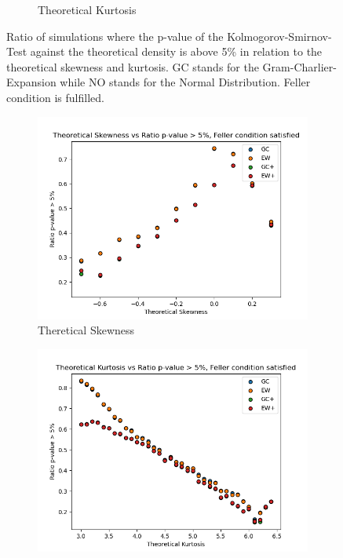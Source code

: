 \begin{figure}
\begin{subfigure}[b]{0.49\textwidth}
        \caption{Theoretical Kurtosis}
    \end{subfigure}
    \caption{Ratio of simulations where the p-value of the Kolmogorov-Smirnov-Test against the theoretical density is above 5\% in relation to the theoretical skewness and kurtosis. GC stands for the Gram-Charlier-Expansion while NO stands for the Normal Distribution. Feller condition is fulfilled.}
    \label{fig:gc_vs_no_theoretical_skewness_kurtosis}
\end{figure}

\begin{figure}
    \centering
    \begin{subfigure}[b]{0.49\textwidth}
        \centering
        \includegraphics[width=\textwidth]{img/theoretical_skewness_vs_ratio_gc_ew_feller_condition_true.png}
        \caption{Theretical Skewness}
    \end{subfigure}
    \hfill
    \begin{subfigure}[b]{0.49\textwidth}
        \centering
        \includegraphics[width=\textwidth]{img/theoretical_kurtosis_vs_ratio_gc_ew_feller_condition_true.png}

\end{subfigure}
\end{figure}
